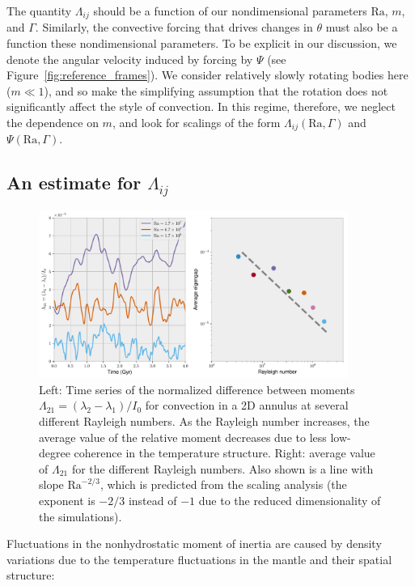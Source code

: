 \documentclass[preprint,12pt,authoryear]{elsarticle}
\begin{document}
The quantity $\Lambda_{ij}$ should be a function of our nondimensional parameters $\mathrm{Ra}$, $m$, and $\Gamma$. 
Similarly, the convective forcing that drives changes in $\theta$ must also be a function these nondimensional parameters. 
To be explicit in our discussion, we denote the angular velocity induced by forcing by ${\Psi}$ (see Figure~\ref{fig:reference_frames}).
We consider relatively slowly rotating bodies here ($m \ll 1$), and so make the simplifying assumption that the rotation does not significantly affect the style of convection.  
In this regime, therefore, we neglect the dependence on $m$, 
and look for scalings of the form $\Lambda_{ij}(\mathrm{Ra}, \Gamma)$ and $\Psi(\mathrm{Ra}, \Gamma)$.


\subsection{An estimate for $\Lambda_{ij}$}
\label{sec:lambda}

\begin{figure}
\centering
\includegraphics[width=0.9\textwidth]{figures/eigengap.pdf}
\caption[Normalized difference between convective moments of inertia in the mantle.]{ Left: Time series of the normalized difference between moments $\Lambda_{21} = (\lambda_2 - \lambda_1)/I_0$ for convection in a 2D annulus at several different Rayleigh numbers.  As the Rayleigh number increases, the average value of the relative moment decreases due to less low-degree coherence in the temperature structure.  Right:  average value of $\Lambda_{21}$ for the different Rayleigh numbers.  Also shown is a line with slope $\mathrm{Ra}^{-2/3}$, which is predicted from the scaling analysis (the exponent is $-2/3$ instead of $-1$ due to the reduced dimensionality of the simulations).}
\label{fig:eigengap}
\end{figure}


Fluctuations in the nonhydrostatic moment of inertia are caused by density variations 
due to the temperature fluctuations in the mantle and their spatial structure:
\end{document}
